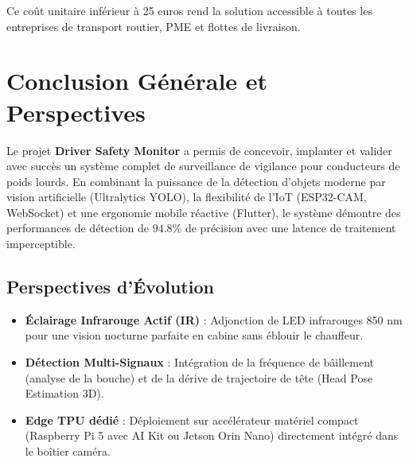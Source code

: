 \documentclass[11pt,a4paper]{article}
\begin{document}
Ce coût unitaire inférieur à 25 euros rend la solution accessible à toutes les entreprises de transport routier, PME et flottes de livraison.

\section{Conclusion Générale et Perspectives}

Le projet \textbf{Driver Safety Monitor} a permis de concevoir, implanter et valider avec succès un système complet de surveillance de vigilance pour conducteurs de poids lourds. En combinant la puissance de la détection d'objets moderne par vision artificielle (Ultralytics YOLO), la flexibilité de l'IoT (ESP32-CAM, WebSocket) et une ergonomie mobile réactive (Flutter), le système démontre des performances de détection de $94.8\%$ de précision avec une latence de traitement imperceptible.

\subsection{Perspectives d'Évolution}
\begin{itemize}
    \item \textbf{Éclairage Infrarouge Actif (IR)} : Adjonction de LED infrarouges 850 nm pour une vision nocturne parfaite en cabine sans éblouir le chauffeur.
    \item \textbf{Détection Multi-Signaux} : Intégration de la fréquence de bâillement (analyse de la bouche) et de la dérive de trajectoire de tête (Head Pose Estimation 3D).
    \item \textbf{Edge TPU dédié} : Déploiement sur accélérateur matériel compact (Raspberry Pi 5 avec AI Kit ou Jetson Orin Nano) directement intégré dans le boîtier caméra.
\end{itemize}

\end{document}
